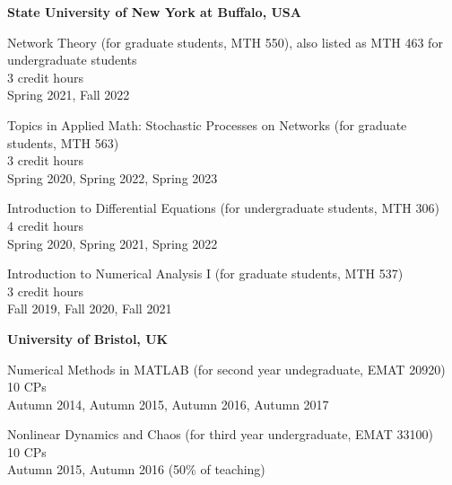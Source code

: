 \documentclass[11pt,letter]{article}
\renewenvironment{itemize}{
  \begin{list}{}{
    \setlength{\leftmargin}{1.5em}
    \setlength{\itemsep}{0.25em}
    \setlength{\parskip}{0pt}
    \setlength{\parsep}{0.25em}
  }
}{
  \end{list}
}
\begin{document}
\begin{itemize}

\item \textbf{State University of New York at Buffalo, USA}

\item Network Theory (for graduate students, MTH 550), also listed as MTH 463 for undergraduate students\\
3 credit hours\\
Spring 2021, Fall 2022

\item Topics in Applied Math: Stochastic Processes on Networks (for graduate students, MTH 563)\\
3 credit hours\\
Spring 2020, Spring 2022, Spring 2023

\item Introduction to Differential Equations (for undergraduate students, MTH 306)\\
4 credit hours\\
Spring 2020, Spring 2021, Spring 2022

\item Introduction to Numerical Analysis I (for graduate students, MTH 537)\\
3 credit hours\\
Fall 2019, Fall 2020, Fall 2021


 
\item \textbf{University of Bristol, UK}

\item Numerical Methods in MATLAB (for second year undegraduate, EMAT 20920)\\
10 CPs\\
Autumn 2014, Autumn 2015, Autumn 2016, Autumn 2017

\item Nonlinear Dynamics and Chaos (for third year undergraduate, EMAT 33100)\\
10 CPs\\
Autumn 2015, Autumn 2016 (50\% of teaching) %


\end{itemize}
\end{document}
